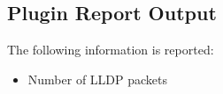 \documentclass[documentation]{subfiles}
\begin{document}

\subsection{Plugin Report Output}
The following information is reported:
\begin{itemize}
    \item Number of LLDP packets
\end{itemize}


%
%


\end{document}
